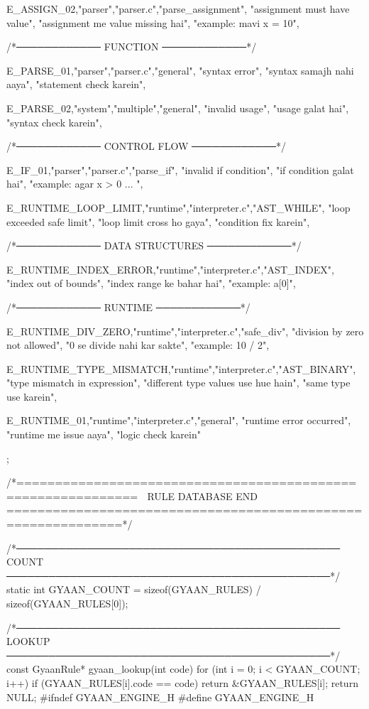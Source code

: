 \documentclass{article}
\begin{document}
{{E_ASSIGN_02,"parser","parser.c","parse_assignment",
"assignment must have value",
"assignment me value missing hai",
"example: mavi x = 10"},

/*──────────── FUNCTION ────────────*/

{E_PARSE_01,"parser","parser.c","general",
"syntax error",
"syntax samajh nahi aaya",
"statement check karein"},

{E_PARSE_02,"system","multiple","general",
"invalid usage",
"usage galat hai",
"syntax check karein"},

/*──────────── CONTROL FLOW ────────────*/

{E_IF_01,"parser","parser.c","parse_if",
"invalid if condition",
"if condition galat hai",
"example: agar x > 0 { ... }"},

{E_RUNTIME_LOOP_LIMIT,"runtime","interpreter.c","AST_WHILE",
"loop exceeded safe limit",
"loop limit cross ho gaya",
"condition fix karein"},

/*──────────── DATA STRUCTURES ────────────*/

{E_RUNTIME_INDEX_ERROR,"runtime","interpreter.c","AST_INDEX",
"index out of bounds",
"index range ke bahar hai",
"example: a[0]"},

/*──────────── RUNTIME ────────────*/

{E_RUNTIME_DIV_ZERO,"runtime","interpreter.c","safe_div",
"division by zero not allowed",
"0 se divide nahi kar sakte",
"example: 10 / 2"},

{E_RUNTIME_TYPE_MISMATCH,"runtime","interpreter.c","AST_BINARY",
"type mismatch in expression",
"different type values use hue hain",
"same type use karein"},

{E_RUNTIME_01,"runtime","interpreter.c","general",
"runtime error occurred",
"runtime me issue aaya",
"logic check karein"}

};

/*=============================================================
  🧠 RULE DATABASE END
=============================================================*/

/*──────────────────────────────────────────────
  COUNT
──────────────────────────────────────────────*/
static int GYAAN_COUNT =
sizeof(GYAAN_RULES) / sizeof(GYAAN_RULES[0]);

/*──────────────────────────────────────────────
  LOOKUP
──────────────────────────────────────────────*/
const GyaanRule* gyaan_lookup(int code)
{
    for (int i = 0; i < GYAAN_COUNT; i++) {
        if (GYAAN_RULES[i].code == code) {
            return &GYAAN_RULES[i];
        }
    }
    return NULL;
}
#ifndef GYAAN_ENGINE_H
#define GYAAN_ENGINE_H
\end{document}
